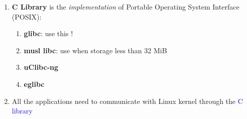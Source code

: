 \documentclass[12pt,a4paper]{article}
\newcommand{\bt}[1]{\textcolor{blue}{#1}}
\begin{document}
\begin{enumerate}
	\item \textbf{C Library} is the \textit{implementation} of Portable Operating System Interface (POSIX):
	\begin{enumerate}
		\item \textbf{glibc}: use this !
		\item \textbf{musl libc}: use when storage less than 32 MiB
		\item \textbf{uClibc-ng}
		\item \textbf{eglibc}
	\end{enumerate}
	\item All the applications need to communicate with Linux kernel through the \bt{C library}
\end{enumerate}
	
\end{document}
